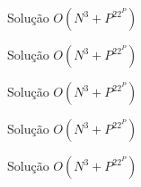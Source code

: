 \begin{frame}[fragile]{Solução $O(N^3 + P^22^P)$}
\end{frame}

\begin{frame}[fragile]{Solução $O(N^3 + P^22^P)$}
\end{frame}

\begin{frame}[fragile]{Solução $O(N^3 + P^22^P)$}
\end{frame}

\begin{frame}[fragile]{Solução $O(N^3 + P^22^P)$}
\end{frame}

\begin{frame}[fragile]{Solução $O(N^3 + P^22^P)$}
\end{frame}
